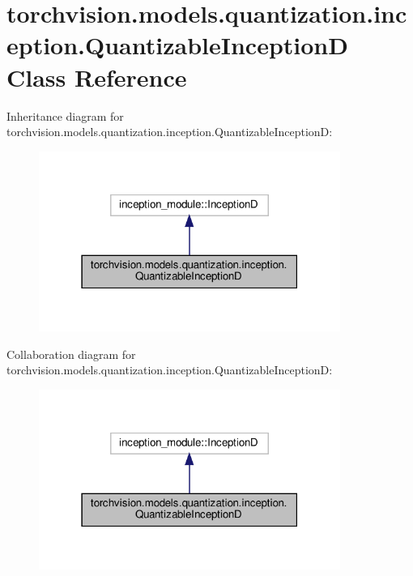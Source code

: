 \hypertarget{classtorchvision_1_1models_1_1quantization_1_1inception_1_1QuantizableInceptionD}{}\section{torchvision.\+models.\+quantization.\+inception.\+Quantizable\+InceptionD Class Reference}
\label{classtorchvision_1_1models_1_1quantization_1_1inception_1_1QuantizableInceptionD}


Inheritance diagram for torchvision.\+models.\+quantization.\+inception.\+Quantizable\+InceptionD\+:
\nopagebreak
\begin{figure}[H]
\begin{center}
\leavevmode
\includegraphics[width=279pt]{classtorchvision_1_1models_1_1quantization_1_1inception_1_1QuantizableInceptionD__inherit__graph}
\end{center}
\end{figure}


Collaboration diagram for torchvision.\+models.\+quantization.\+inception.\+Quantizable\+InceptionD\+:
\nopagebreak
\begin{figure}[H]
\begin{center}
\leavevmode
\includegraphics[width=279pt]{classtorchvision_1_1models_1_1quantization_1_1inception_1_1QuantizableInceptionD__coll__graph}
\end{center}
\end{figure}
